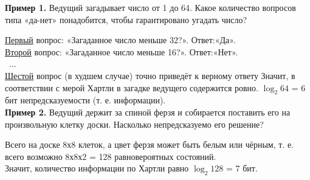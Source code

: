 \newpage
\small
\rhead{\textbf{\textcolor{blue}{П}\textcolor{gray}{ример применения меры Хартли на практике}}}

\vskip 0.5cm

\textbf{Пример 1.} Ведущий загадывает число от 1 до 64. Какое количество вопросов типа «да-нет» понадобится, чтобы гарантировано угадать число?

\textbullet \underline{Первый} вопрос: «Загаданное число меньше 32?». Ответ:«Да».\\
\textbullet \underline{Второй} вопрос: «Загаданное число меньше 16?». Ответ:«Нет».\\
\textbullet \ \hspace{0.5cm}...\\
\textbullet \underline{Шестой} вопрос (в худшем случае) точно приведёт к верному ответу
\textbullet Значит, в соответствии с мерой Хартли в загадке ведущего содержится ровно. $\log_2 64$ = 6 бит непредсказуемости (т. е. информации).\\
\vspace{0.5cm}
\textbf{Пример 2.} Ведущий держит за спиной ферзя и собирается поставить его на произвольную клетку доски. Насколько непредсказуемо его решение?

\textbullet Всего на доске 8х8 клеток, а цвет ферзя может быть белым или чёрным, т. е. всего возможно 8х8х2 = 128 равновероятных состояний. \\
\textbullet Значит, количество информации по Хартли равно $\log_2 128$ = 7 бит.\\

